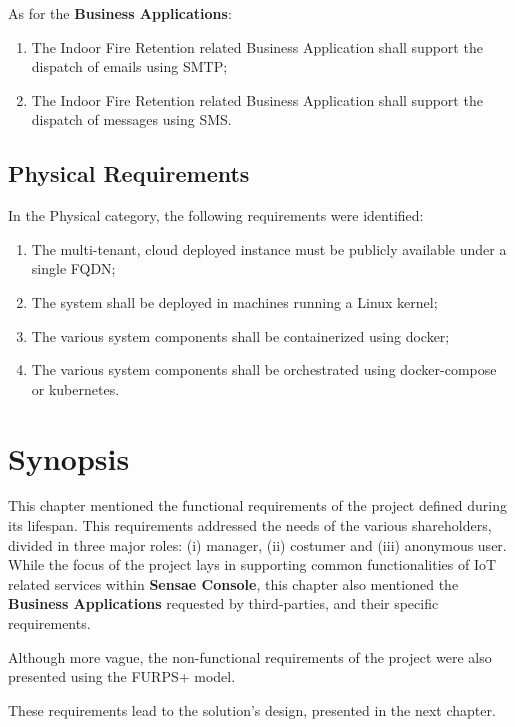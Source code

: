 As for the \textbf{Business Applications}:

\begin{enumerate}
    \item The Indoor Fire Retention related Business Application shall support the dispatch of emails using \gls{SMTP};
    \item The Indoor Fire Retention related Business Application shall support the dispatch of messages using \gls{SMS}.
\end{enumerate}

\subsection{Physical Requirements}
\label{subsec:requirements:non_functional:physical}

In the Physical category, the following requirements were identified:

\begin{enumerate}
    \item The multi-tenant, cloud deployed instance must be publicly available under a single \gls{FQDN};
    \item The system shall be deployed in machines running a Linux kernel;
    \item The various system components shall be containerized using docker;
    \item The various system components shall be orchestrated using docker-compose or kubernetes.
\end{enumerate}

\section{Synopsis}
\label{subsec:requirements:synopsis}

This chapter mentioned the functional requirements of the project defined during its lifespan. This requirements addressed the needs of the various shareholders, divided in three major roles: (i) manager, (ii) costumer and (iii) anonymous user. While the focus of the project lays in supporting common functionalities of \gls{IoT} related services within \textbf{Sensae Console}, this chapter also mentioned the \textbf{Business Applications} requested by third-parties, and their specific requirements.

Although more vague, the non-functional requirements of the project were also presented using the FURPS+ model.

These requirements lead to the solution's design, presented in the next chapter.
